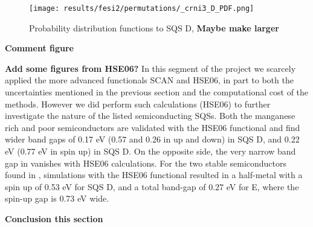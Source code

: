 \begin{figure}[H]
	\centering
	\texttt{[image: results/fesi2/permutations/\_crni3\_D\_PDF.png]}
	\caption{Probability distribution functions to  SQS D, \textbf{Maybe make larger}}
\end{figure}

\textbf{Comment figure \\}

\textbf{Add some figures from HSE06?}
In this segment of the project we scarcely applied the more advanced functionals SCAN and HSE06, in part to both the uncertainties mentioned in the previous section and the computational cost of the methods. However we did perform such calculations (HSE06) to further investigate the nature of the listed semiconducting SQSs. Both the manganese rich and poor semiconductors are validated with the HSE06 functional and find wider band gaps of 0.17 eV (0.57 and 0.26 in up and down) in  SQS D, and 0.22 eV (0.77 eV in spin up) in  SQS D. On the opposite side, the very narrow band gap in  vanishes with HSE06 calculations. For the two stable semiconductors found in , simulations with the HSE06 functional resulted in a half-metal with a spin up of 0.53 eV for SQS D, and a total band-gap of 0.27 eV for E, where the spin-up gap is 0.73 eV wide.

\textbf{Conclusion this section}
